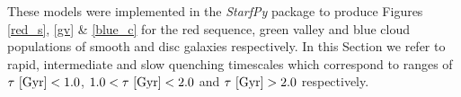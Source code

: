 \documentclass[useAMS,usenatbib]{mn2e}
\def\changed    {\color{titlecol} }
\begin{document}

{\changed These models were implemented in the \emph{StarfPy} package to produce Figures \ref{red_s}, \ref{gv} \& \ref{blue_c} for the red sequence, green valley and blue cloud populations of smooth and disc galaxies respectively.} In this Section we refer to rapid, intermediate and slow quenching timescales which correspond to ranges of {\changed $\tau ~\rm{[Gyr]} < 1.0$, $1.0 < \tau ~\rm{[Gyr]} < 2.0$ and $\tau ~\rm{[Gyr]} > 2.0$} respectively. 
\end{document}
